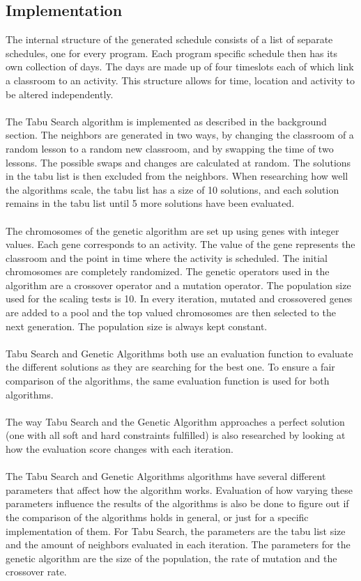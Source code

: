 \documentclass[titlepage,a4paper]{article}
\begin{document}
\subsection{Implementation}
The internal structure of the generated schedule consists of a list of separate schedules, one for every program. Each program specific schedule then has its own collection of days. The days are made up of four timeslots each of which link a classroom to an activity. This structure allows for time, location and activity to be altered independently. \\\\
The Tabu Search algorithm is implemented as described in the background section. The neighbors are generated in two ways, by changing the classroom of a random lesson to a random new classroom, and by swapping the time of two lessons. The possible swaps and changes are calculated at random. The solutions in the tabu list is then excluded from the neighbors. When researching how well the algorithms scale, the tabu list has a size of 10 solutions, and each solution remains in the tabu list until 5 more solutions have been evaluated. \\\\
The chromosomes of the genetic algorithm are set up using genes with integer values. Each gene corresponds to an activity. The value of the gene represents the classroom and the point in time where the activity is scheduled. The initial chromosomes are completely randomized. The genetic operators used in the algorithm are a crossover operator and a mutation operator. The population size used for the scaling tests is 10. In every iteration, mutated and crossovered genes are added to a pool and the top valued chromosomes are then selected to the next generation. The population size is always kept constant. \\\\
Tabu Search and Genetic Algorithms both use an evaluation function to evaluate the different solutions as they are searching for the best one. To ensure a fair comparison of the algorithms, the same evaluation function is used for both algorithms. \\\\
The way Tabu Search and the Genetic Algorithm approaches a perfect solution (one with all soft and hard constraints fulfilled) is also researched by looking at how the evaluation score changes with each iteration. \\\\
The Tabu Search and Genetic Algorithms algorithms have several different parameters that affect how the algorithm works. Evaluation of how varying these parameters influence the results of the algorithms is also be done to figure out if the comparison of the algorithms holds in general, or just for a specific implementation of them.
For Tabu Search, the parameters are the tabu list size and the amount of neighbors evaluated in each iteration. 
The parameters for the genetic algorithm are the size of the population, the rate of mutation and the crossover rate.
\end{document}
